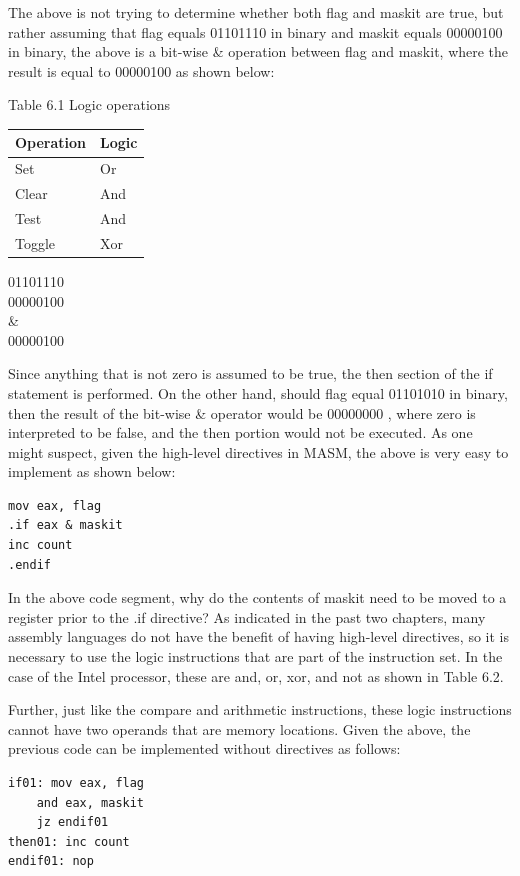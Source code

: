 \documentclass[10pt]{book}
\begin{document}
The above is not trying to determine whether both flag and maskit are true, but rather assuming that flag equals 01101110 in binary and maskit equals 00000100 in binary, the above is a bit-wise \& operation between flag and maskit, where the result is equal to 00000100 as shown below:

Table 6.1 Logic operations

\begin{center}
\begin{tabular}{|ll|}
\hline
Operation & Logic \\
\hline
Set & Or \\
Clear & And \\
Test & And \\
Toggle & Xor \\
\hline
\end{tabular}
\end{center}

01101110\\
00000100\\
\&\\
00000100

Since anything that is not zero is assumed to be true, the then section of the if statement is performed. On the other hand, should flag equal 01101010 in binary, then the result of the bit-wise \& operator would be 00000000 , where zero is interpreted to be false, and the then portion would not be executed. As one might suspect, given the high-level directives in MASM, the above is very easy to implement as shown below:


\begin{verbatim}
mov eax, flag
.if eax & maskit
inc count
.endif
\end{verbatim}

In the above code segment, why do the contents of maskit need to be moved to a register prior to the .if directive? As indicated in the past two chapters, many assembly languages do not have the benefit of having high-level directives, so it is necessary to use the logic instructions that are part of the instruction set. In the case of the Intel processor, these are and, or, xor, and not as shown in Table 6.2.

Further, just like the compare and arithmetic instructions, these logic instructions cannot have two operands that are memory locations. Given the above, the previous code can be implemented without directives as follows:

\begin{verbatim}
if01: mov eax, flag
    and eax, maskit
    jz endif01
then01: inc count
endif01: nop
\end{verbatim}
\end{document}
